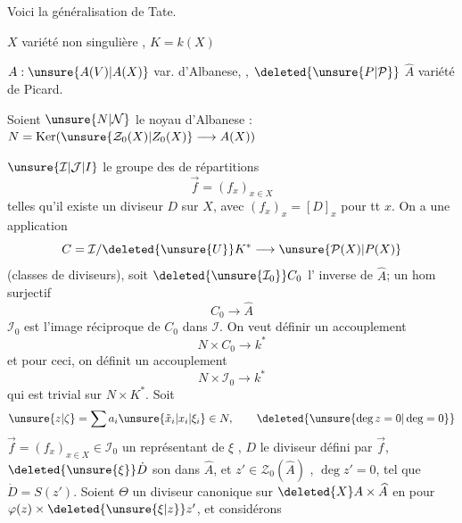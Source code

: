 Voici la généralisation de Tate.

$X$ variété non singulière , $K=k(X)$

$A:\unsure{A(V)|A(X)}$ var. d'Albanese, , $\deleted{\unsure{P|\mathcal P}}$ $\widehat A$ variété de Picard.

Soient $\unsure{N|\mathcal N}$ le noyau d'Albanese : $N=\operatorname{Ker}(\unsure{\mathcal Z_0(X)|Z_0(X)}\longrightarrow A(X))$


$\unsure{\mathcal I|\mathcal J|I}$ le groupe des  de répartitions
\[
\vec f=(f_x)_{x\in X}
\]
telles qu'il existe un diviseur $D$ sur $X$, avec $(f_x)_x=[D]_x$ pour tt $x$. On a une application
\[
C=\mathcal I/\deleted{\unsure{U}}K^*\longrightarrow\unsure{\mathcal P(X)|P(X)}
\]
(classes de diviseurs), soit $\deleted{\unsure{\mathcal I_0}}C_0$ l' inverse de $\widehat A$;  un hom surjectif
\[
C_0\longrightarrow\widehat A
\]
$\mathcal I_0$ est l'image réciproque de $C_0$ dans $\mathcal I$.
On veut définir un accouplement
\[
N\times C_0\longrightarrow k^*
\]
et pour ceci, on définit un accouplement
\[
N\times\mathcal I_0\longrightarrow k^*
\]
qui est trivial sur $N\times K^*$. Soit
\[
\unsure{z|\zeta}=\sum a_i\unsure{\tilde x_i|x_i|\xi_i}\in N,\qquad\deleted{\unsure{\deg z=0|\deg=0}}
\]
 $\vec f=(f_x)_{x\in X}\in\mathcal I_0$ un représentant de $\xi$ ,
$D$ le diviseur défini par $\vec f$, $\deleted{\unsure{\xi}}\dot D$ son  dans $\widehat A$, et $z'\in\mathcal Z_0(\widehat A)$ , $\deg z'=0$, tel que $\dot D=S(z')$.
Soient $\Theta$ un diviseur canonique sur $\deleted{X}A\times\widehat A$ en  pour $\varphi(z)\times\deleted{\unsure{\xi|z}}z'$, et considérons
